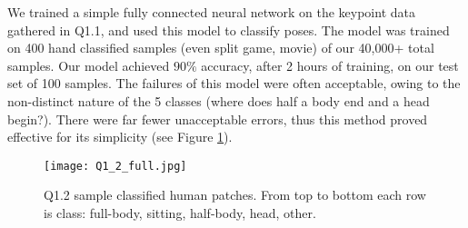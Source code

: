 We trained a simple fully connected neural network on the keypoint data gathered in Q1.1, and used this model to classify poses.
The model was trained on 400 hand classified samples (even split game, movie) of our 40,000+ total samples.
Our model achieved $90\%$ accuracy, after 2 hours of training, on our test set of 100 samples.
The failures of this model were often acceptable, owing to the non-distinct nature of the 5 classes (where does half a body end and a head begin?).
There were far fewer unacceptable errors, thus this method proved effective for its simplicity (see Figure \ref{fig:Q1_2}).

\begin{figure}[h!]
  \begin{center}
  \texttt{[image: Q1\_2\_full.jpg]}
    \caption{Q1.2 sample classified human patches. From top to bottom each row is class: full-body, sitting, half-body, head, other.}
    \label{fig:Q1_2}
  \end{center}
  \end{figure}